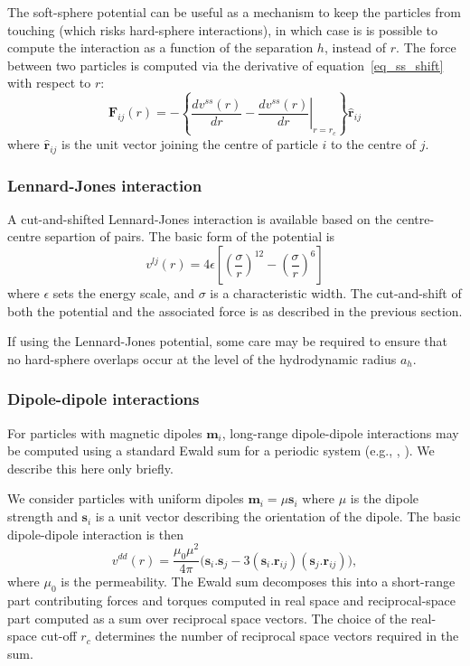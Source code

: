 The soft-sphere potential can be useful as a mechanism to
keep the particles from touching (which risks hard-sphere interactions),
in which case is is possible to compute the interaction as a function
of the separation $h$, instead of $r$. The force between
two particles is computed via the derivative of equation~\ref{eq_ss_shift}
with respect to $r$:
\begin{equation}
\mathbf{F}_{ij}(r) = -\left\{\frac{d v^{ss}(r)}{dr} -
\left. \frac{d v^{ss}(r)}{dr}\right|_{r=r_c} \right\} \mathbf{\hat{r}}_{ij}
\end{equation}
where $\mathbf{\hat{r}}_{ij}$ is the unit vector joining the centre of
particle $i$ to the centre of $j$.


\subsubsection{Lennard-Jones interaction}

\label{section-colloids-lennard-jones}

A cut-and-shifted Lennard-Jones interaction is available based on the
centre-centre separtion of pairs. The basic form
of the potential is
\begin{equation}
v^{lj}(r) = 4\epsilon
\left[ \left(\frac{\sigma}{r}\right)^{12} - 
\left( \frac{\sigma}{r} \right)^6 \right]
\end{equation}
where $\epsilon$ sets the energy scale, and $\sigma$ is a characteristic
width. The cut-and-shift of both the potential and the associated force
is as described in the previous section.

If using the Lennard-Jones potential, some care may be required to
ensure that no hard-sphere overlaps occur at the level of the
hydrodynamic radius $a_h$.

\subsubsection{Dipole-dipole interactions}

For particles with magnetic dipoles $\mathbf{m}_i$, long-range
dipole-dipole interactions may be computed using a standard
Ewald sum for a periodic system
(e.g., \cite{allen-tildesley}, \cite{rapaport1995}).
We describe this here only briefly.

We consider particles with uniform dipoles
$\mathbf{m}_i = \mu \mathbf{s}_i$ where $\mu$ is the dipole
strength and $\mathbf{s}_i$ is
a unit vector describing the orientation of the dipole. The
basic dipole-dipole interaction is then
\begin{equation}
v^{dd} (r) = \frac{\mu_0 \mu^2}{4\pi}
\big( \mathbf{s}_i . \mathbf{s}_j
- 3(\mathbf{s}_i.\mathbf{r}_{ij})( \mathbf{s}_j .\mathbf{r}_{ij})
\big),
\end{equation}
where $\mu_0$ is the permeability. The Ewald sum decomposes this
into a short-range part contributing forces and torques computed
in real space and reciprocal-space part computed as a sum over
reciprocal space vectors. The choice of the real-space cut-off
$r_c$ determines the number of reciprocal space vectors required
in the sum.

